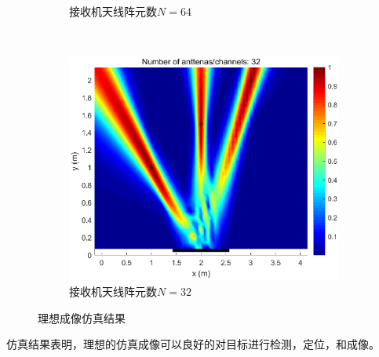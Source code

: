\begin{figure}[htb]
\begin{subfigure}[t]{.45\linewidth}
      \caption{接收机天线阵元数$N=64$}
  \end{subfigure}
  \\
  \begin{subfigure}[t]{.45\linewidth}
    \centering
    \includegraphics[width=1\textwidth]{figures/expected/32.eps}
    \caption{接收机天线阵元数$N=32$}
\end{subfigure}
  \caption{理想成像仿真结果}\label{理想成像仿真结果}
\end{figure}
仿真结果表明，理想的仿真成像可以良好的对目标进行检测，定位，和成像。